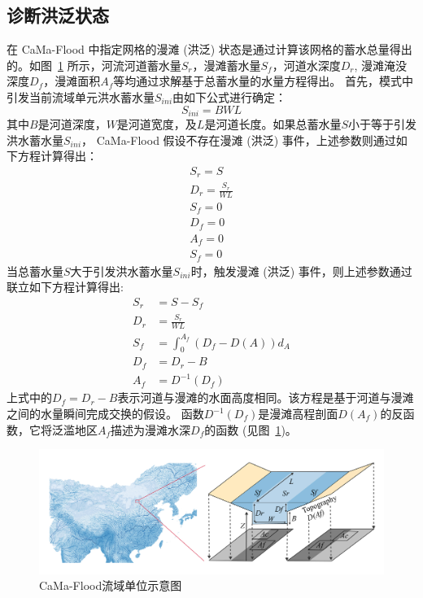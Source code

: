 \subsection{诊断洪泛状态}\label{诊断洪泛状态}
在 CaMa-Flood 中指定网格的漫滩 (洪泛) 状态是通过计算该网格的蓄水总量得出的。如图~\ref{fig:CaMa-Flood流域单位示意图}
所示，河流河道蓄水量$S_r$，漫滩蓄水量$S_f$，河道水深度$D_r$, 漫滩淹没深度$D_f$，漫滩面积$A_f$等均通过求解基于总蓄水量的水量方程得出。
首先，模式中引发当前流域单元洪水蓄水量$S_{ini}$由如下公式进行确定：
\begin{equation}
S_{ ini }=B WL
\end{equation}
其中$B$是河道深度，$W$是河道宽度，及$L$是河道长度。如果总蓄水量$S$小于等于引发洪水蓄水量$S_{ini}$，
CaMa-Flood 假设不存在漫滩 (洪泛) 事件，上述参数则通过如下方程计算得出：
\begin{equation}
    \begin{array}{l}S_r=S \\ D_r=\frac{S_r}{WL} \\ S_f=0 \\ D_f=0 \\ A_f=0 \\ S_f=0\end{array}
\end{equation}
当总蓄水量$S$大于引发洪水蓄水量$S_{ini}$时，触发漫滩 (洪泛) 事件，则上述参数通过联立如下方程计算得出:
\begin{equation}
\begin{aligned}
S_r &=S-S_f \\ 
D_r &=\frac{S_r}{W L} \\
S_f &=\int_{0}^{A_f}(D_f-D(A)) d_A \\
D_f &=D_r-B \\ 
A_f &=D^{-1}(D_f)
\end{aligned}
\end{equation}
上式中的$D_f = D_r - B$表示河道与漫滩的水面高度相同。该方程是基于河道与漫滩之间的水量瞬间完成交换的假设。
函数$D^{-1}(D_f)$是漫滩高程剖面$D(A_f)$的反函数，它将泛滥地区$A_f$描述为漫滩水深$D_f$的函数 (见图~\ref{fig:CaMa-Flood流域单位示意图})。


{
\begin{figure}[htbp]
\centering
\includegraphics[width=\textwidth]{Figures/陆地表面的水分循环/CaMa-Flood流域单位示意图.png}
\caption{CaMa-Flood流域单位示意图}
\label{fig:CaMa-Flood流域单位示意图}
\end{figure}
}

